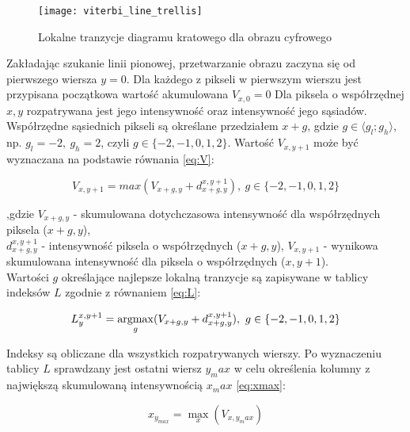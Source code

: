 \documentclass[document.tex]{subfiles}
\begin{document}
\begin{figure}[h]
\texttt{[image: viterbi\_line\_trellis]}
\caption{Lokalne tranzycje diagramu kratowego dla obrazu cyfrowego\protect\cite{Mazurek_Robot_Viterbi}}
\label{fig:viterbi_trellis}
\end{figure}

Zakładając szukanie linii pionowej, przetwarzanie obrazu zaczyna się od pierwszego wiersza $y = 0$. 
Dla każdego z pikseli w pierwszym wierszu jest przypisana początkowa wartość akumulowana $V_{x, 0} = 0$
Dla piksela o współrzędnej $x, y$ rozpatrywana jest jego intensywność oraz intensywność jego sąsiadów.
Współrzędne sąsiednich pikseli są określane przedziałem $x + g$, gdzie $g\in \langle g_l;g_h\rangle$, np. $g_l = -2,\ g_h = 2$, czyli $g\in \{-2, -1, 0, 1, 2\}$. Wartość $V_{x,y+1}$ może być wyznaczana na podstawie równania \ref{eq:V}\cite{Mazurek_Robot_Viterbi}\cite{viterbi_ch_6}:

\begin{equation}
    V_{x, y+1} = max(V_{x+g, y} + d_{x+g, y}^{x,y+1}),\ g\in\{-2,-1,0,1,2\}
    \label{eq:V}
\end{equation}


,gdzie $V_{x+g, y}$ - skumulowana dotychczasowa intensywność dla współrzędnych piksela ($x+g, y$), 
\\
$d_{x+g, y}^{x,y+1}$ - intensywność piksela o współrzędnych ($x+g, y$),  $V_{x, y+1}$ - wynikowa skumulowana intensywność dla piksela o współrzędnych (${x, y+1}$).
\\
Wartości $g$ określające najlepsze lokalną tranzycje są zapisywane w tablicy indeksów $L$ zgodnie z równaniem \ref{eq:L}\cite{Mazurek_Robot_Viterbi}\cite{viterbi_ch_6}:

\begin{equation}
   L_{y}^{x, y+1} = \argmax_{g}\limits(V_{x+g, y} + d_{x+g, y}^{x,y+1}),\ g\in\{-2,-1,0,1,2\}
    \label{eq:L}
\end{equation}

Indeksy są obliczane dla wszystkich rozpatrywanych wierszy. Po wyznaczeniu tablicy $L$ sprawdzany jest ostatni wiersz $y_max$ w celu określenia kolumny z największą skumulowaną intensywnością $x_max$ \ref{eq:xmax}:

\begin{equation}
   x_{y_{max}} = \max_{x}\limits(V_{x, y_max})
    \label{eq:xmax}
\end{equation}
\end{document}
